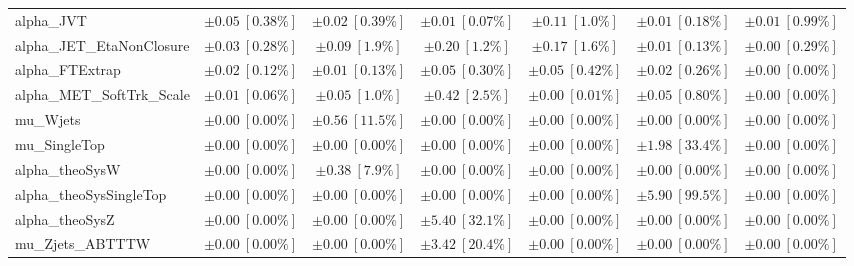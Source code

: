 \begin{sidewaystable}
\begin{center}
\begin{tabular*}{\textwidth}{@{\extracolsep{\fill}}lcccccc}
alpha\_JVT         & $\pm 0.05\ [0.38\%] $          & $\pm 0.02\ [0.39\%] $          & $\pm 0.01\ [0.07\%] $          & $\pm 0.11\ [1.0\%] $          & $\pm 0.01\ [0.18\%] $          & $\pm 0.01\ [0.99\%] $       \\
alpha\_JET\_EtaNonClosure         & $\pm 0.03\ [0.28\%] $          & $\pm 0.09\ [1.9\%] $          & $\pm 0.20\ [1.2\%] $          & $\pm 0.17\ [1.6\%] $          & $\pm 0.01\ [0.13\%] $          & $\pm 0.00\ [0.29\%] $       \\
alpha\_FTExtrap         & $\pm 0.02\ [0.12\%] $          & $\pm 0.01\ [0.13\%] $          & $\pm 0.05\ [0.30\%] $          & $\pm 0.05\ [0.42\%] $          & $\pm 0.02\ [0.26\%] $          & $\pm 0.00\ [0.00\%] $       \\
alpha\_MET\_SoftTrk\_Scale         & $\pm 0.01\ [0.06\%] $          & $\pm 0.05\ [1.0\%] $          & $\pm 0.42\ [2.5\%] $          & $\pm 0.00\ [0.01\%] $          & $\pm 0.05\ [0.80\%] $          & $\pm 0.00\ [0.00\%] $       \\
mu\_Wjets         & $\pm 0.00\ [0.00\%] $          & $\pm 0.56\ [11.5\%] $          & $\pm 0.00\ [0.00\%] $          & $\pm 0.00\ [0.00\%] $          & $\pm 0.00\ [0.00\%] $          & $\pm 0.00\ [0.00\%] $       \\
mu\_SingleTop         & $\pm 0.00\ [0.00\%] $          & $\pm 0.00\ [0.00\%] $          & $\pm 0.00\ [0.00\%] $          & $\pm 0.00\ [0.00\%] $          & $\pm 1.98\ [33.4\%] $          & $\pm 0.00\ [0.00\%] $       \\
alpha\_theoSysW         & $\pm 0.00\ [0.00\%] $          & $\pm 0.38\ [7.9\%] $          & $\pm 0.00\ [0.00\%] $          & $\pm 0.00\ [0.00\%] $          & $\pm 0.00\ [0.00\%] $          & $\pm 0.00\ [0.00\%] $       \\
alpha\_theoSysSingleTop         & $\pm 0.00\ [0.00\%] $          & $\pm 0.00\ [0.00\%] $          & $\pm 0.00\ [0.00\%] $          & $\pm 0.00\ [0.00\%] $          & $\pm 5.90\ [99.5\%] $          & $\pm 0.00\ [0.00\%] $       \\
alpha\_theoSysZ         & $\pm 0.00\ [0.00\%] $          & $\pm 0.00\ [0.00\%] $          & $\pm 5.40\ [32.1\%] $          & $\pm 0.00\ [0.00\%] $          & $\pm 0.00\ [0.00\%] $          & $\pm 0.00\ [0.00\%] $       \\
mu\_Zjets\_ABTTTW         & $\pm 0.00\ [0.00\%] $          & $\pm 0.00\ [0.00\%] $          & $\pm 3.42\ [20.4\%] $          & $\pm 0.00\ [0.00\%] $          & $\pm 0.00\ [0.00\%] $          & $\pm 0.00\ [0.00\%] $       \\

\end{tabular*}
\end{center}
\end{sidewaystable}

